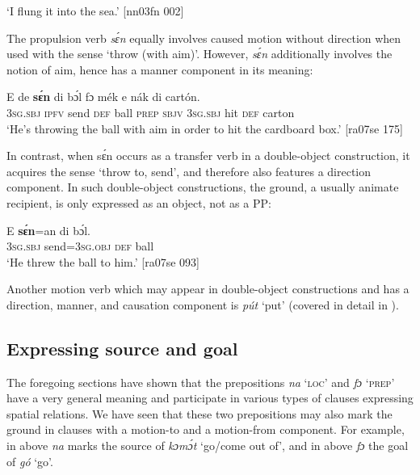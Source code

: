 \glt ‘I flung it into the sea.’ [nn03fn 002]
\z

The propulsion verb \textit{sɛ́n} equally involves caused motion without direction when used with the sense ‘throw (with aim)’. However, \textit{sɛ́n} additionally involves the notion of aim, hence has a manner component in its meaning:


\ea%
    \label{ex:key:968}
    \gll E    de  \textbf{sɛ́n}    di  bɔ́l  fɔ  mék  e    nák  di  cartón.\\
\textsc{3sg.sbj}  \textsc{ipfv}  send  \textsc{def}  ball  \textsc{prep}  \textsc{sbjv}  \textsc{3sg.sbj}  hit  \textsc{def}  carton\\

\glt ‘He’s throwing the ball with aim in order to hit the cardboard box.’ [ra07se 175]
\z

In contrast, when sɛ́n occurs as a transfer verb in a double-object construction, it acquires the sense ‘throw to, send’, and therefore also features a direction component. In such double-object constructions, the ground, a usually animate recipient{\fff}, is only expressed as an object, not as a PP: 


\ea%
    \label{ex:key:969}
    \gll E    \textbf{sɛ́n}=an    di  bɔ́l.\\
\textsc{3sg.sbj}  send=\textsc{3sg.obj}  \textsc{def}  ball\\

\glt ‘He threw the ball to him.’ [ra07se 093]
\z

Another motion verb which may appear in double-object constructions and has a direction, manner, and causation component is \textit{pút} ‘put’ (covered in detail in ).

\subsection{Expressing source and goal}\label{sec:8.1.5}

The foregoing sections have shown that the prepositions \textit{na} ‘\textsc{loc}’ and \textit{fɔ} ‘\textsc{prep}’ have a very general meaning and participate in various types of clauses expressing spatial relations. We have seen that these two prepositions may also mark the ground in clauses with a motion-to and a motion-from component. For example, in  above \textit{na} marks the source of \textit{kɔmɔ́t} ‘go/come out of’, and in  above \textit{fɔ} the goal of \textit{gó} ‘go’. 


